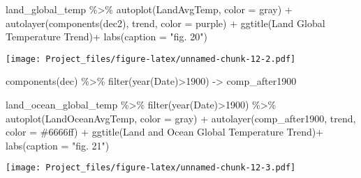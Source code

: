 \documentclass[
]{article}
\newenvironment{Shaded}{\begin{snugshade}}{\end{snugshade}}
\newcommand{\AttributeTok}[1]{\textcolor[rgb]{0.77,0.63,0.00}{#1}}
\newcommand{\DecValTok}[1]{\textcolor[rgb]{0.00,0.00,0.81}{#1}}
\newcommand{\FunctionTok}[1]{\textcolor[rgb]{0.00,0.00,0.00}{#1}}
\newcommand{\NormalTok}[1]{#1}
\newcommand{\OtherTok}[1]{\textcolor[rgb]{0.56,0.35,0.01}{#1}}
\newcommand{\SpecialCharTok}[1]{\textcolor[rgb]{0.00,0.00,0.00}{#1}}
\newcommand{\StringTok}[1]{\textcolor[rgb]{0.31,0.60,0.02}{#1}}
\begin{document}
\begin{Shaded}
\begin{Highlighting}[]
\NormalTok{land\_global\_temp }\SpecialCharTok{\%\textgreater{}\%}
  \FunctionTok{autoplot}\NormalTok{(LandAvgTemp, }\AttributeTok{color =} \StringTok{\textquotesingle{}gray\textquotesingle{}}\NormalTok{) }\SpecialCharTok{+} 
  \FunctionTok{autolayer}\NormalTok{(}\FunctionTok{components}\NormalTok{(dec2), trend, }\AttributeTok{color =} \StringTok{\textquotesingle{}purple\textquotesingle{}}\NormalTok{) }\SpecialCharTok{+} 
  \FunctionTok{ggtitle}\NormalTok{(}\StringTok{\textquotesingle{}Land Global Temperature Trend\textquotesingle{}}\NormalTok{)}\SpecialCharTok{+}
  \FunctionTok{labs}\NormalTok{(}\AttributeTok{caption =} \StringTok{"fig. 20"}\NormalTok{)}
\end{Highlighting}
\end{Shaded}

\texttt{[image: Project\_files/figure-latex/unnamed-chunk-12-2.pdf]}

\begin{Shaded}
\begin{Highlighting}[]
\FunctionTok{components}\NormalTok{(dec) }\SpecialCharTok{\%\textgreater{}\%}
  \FunctionTok{filter}\NormalTok{(}\FunctionTok{year}\NormalTok{(Date)}\SpecialCharTok{\textgreater{}}\DecValTok{1900}\NormalTok{) }\OtherTok{{-}\textgreater{}}\NormalTok{ comp\_after1900}

\NormalTok{land\_ocean\_global\_temp }\SpecialCharTok{\%\textgreater{}\%}
  \FunctionTok{filter}\NormalTok{(}\FunctionTok{year}\NormalTok{(Date)}\SpecialCharTok{\textgreater{}}\DecValTok{1900}\NormalTok{) }\SpecialCharTok{\%\textgreater{}\%}
  \FunctionTok{autoplot}\NormalTok{(LandOceanAvgTemp, }\AttributeTok{color =} \StringTok{\textquotesingle{}gray\textquotesingle{}}\NormalTok{) }\SpecialCharTok{+} 
  \FunctionTok{autolayer}\NormalTok{(comp\_after1900, trend, }\AttributeTok{color =} \StringTok{\textquotesingle{}\#6666ff\textquotesingle{}}\NormalTok{) }\SpecialCharTok{+} 
  \FunctionTok{ggtitle}\NormalTok{(}\StringTok{\textquotesingle{}Land and Ocean Global Temperature Trend\textquotesingle{}}\NormalTok{)}\SpecialCharTok{+}
  \FunctionTok{labs}\NormalTok{(}\AttributeTok{caption =} \StringTok{"fig. 21"}\NormalTok{)}
\end{Highlighting}
\end{Shaded}

\texttt{[image: Project\_files/figure-latex/unnamed-chunk-12-3.pdf]}
\end{document}
